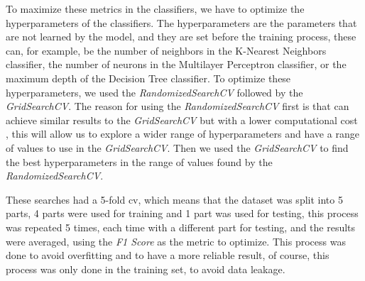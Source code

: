 To maximize these metrics in the classifiers, we have to optimize the hyperparameters of the classifiers. The hyperparameters are the parameters that are not learned by the model, and they are set before the training process, these can, for example, be the number of neighbors in the K-Nearest Neighbors classifier, the number of neurons in the Multilayer Perceptron classifier, or the maximum depth of the Decision Tree classifier. To optimize these hyperparameters, we used the \textit{RandomizedSearchCV} followed by the \textit{GridSearchCV}. The reason for using the \textit{RandomizedSearchCV} first is that can achieve similar results to the \textit{GridSearchCV} but with a lower computational cost \cite{bergstra_random_nodate}, this will allow us to explore a wider range of hyperparameters and have a range of values to use in the \textit{GridSearchCV}. Then we used the \textit{GridSearchCV} to find the best hyperparameters in the range of values found by the \textit{RandomizedSearchCV}.


These searches had a 5-fold \ac{cv}, which means that the dataset was split into 5 parts, 4 parts were used for training and 1 part was used for testing, this process was repeated 5 times, each time with a different part for testing, and the results were averaged, using the \textit{F1 Score} as the metric to optimize. This process was done to avoid overfitting and to have a more reliable result, of course, this process was only done in the training set, to avoid data leakage.